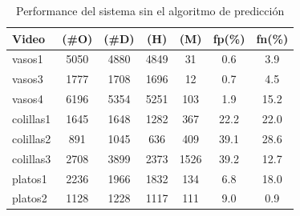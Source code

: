 \begin{table}[htb]
  \begin{tabular}{|l | c | c | c | c | c | c |}
	\hline  
	\textbf{Video} & \textbf{(\#O)} &  \textbf{(\#D)} & \textbf{(H)} & 
	\textbf{(M)} & \textbf{fp(\%)} & \textbf{fn(\%)}\\
	\hline
	\hline
	vasos1 & 5050 & 4880 & 4849 & 31 & 0.6 & 3.9 \\
	vasos3 & 1777 & 1708 & 1696 & 12 & 0.7 & 4.5 \\	
	vasos4 & 6196 & 5354 & 5251 & 103 & 1.9 & 15.2 \\
	\hline
	colillas1 & 1645 & 1648 & 1282 & 367 & 22.2 & 22.0 \\
	colillas2 & 891 & 1045 & 636 &  409 & 39.1 & 28.6 \\
	colillas3 & 2708 & 3899 & 2373 & 1526 & 39.2 & 12.7 \\
	\hline
	platos1 & 2236 & 1966 & 1832 & 134 & 6.8 & 18.0\\
	platos2 & 1128 & 1228 & 1117 & 111& 9.0 & 0.9 \\
	\hline
	\end{tabular}
	\caption{\label{tab:result} Performance del sistema sin el algoritmo de predicción}
\end{table}

